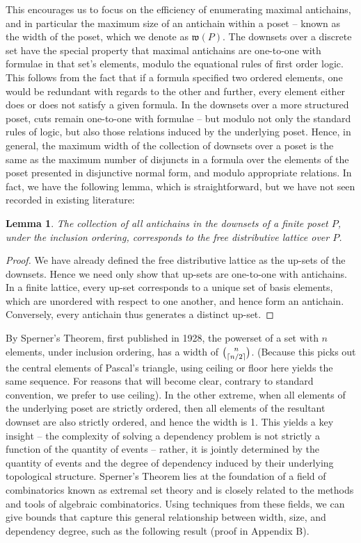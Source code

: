 \documentclass[hoptionsi,review,format=acmsmall]{acmart}
\newtheorem{lemma}[theorem]{Lemma}
\theoremstyle{definition}
\newcommand{\Wf}{\mathfrak{w}}
\DeclarePairedDelimiter\ceil{\lceil}{\rceil}
\begin{document}
This encourages us to focus on the efficiency of enumerating maximal antichains, and in particular the maximum size of an antichain within a poset -- known as the width of the poset, which we denote as \(\Wf(P)\). The downsets over a discrete set have the special property that maximal antichains are one-to-one with formulae in that set's elements, modulo the equational rules of first order logic. This follows from the fact that if a formula specified two ordered elements, one would be redundant with regards to the other and further, every element either does or does not satisfy a given formula. In the downsets over a more structured poset, cuts remain one-to-one with formulae -- but modulo not only the standard rules of logic, but also those relations induced by the underlying poset. Hence, in general, the maximum width of the collection of downsets over a poset is the same as the maximum number of disjuncts in a formula over the elements of the poset presented in disjunctive normal form, and modulo appropriate relations. In fact, we have the following lemma, which is straightforward, but we have not seen recorded in existing literature:

\begin{lemma}
The collection of all antichains in the downsets of a finite poset \(P\), under the inclusion ordering, corresponds to the free distributive lattice over \(P\).
\end{lemma}
\begin{proof}
We have already defined the free distributive lattice as the up-sets of the downsets. Hence we need only show that up-sets are one-to-one with antichains. In a finite lattice, every up-set corresponds to a unique set of basis elements, which are unordered with respect to one another, and hence form an antichain. Conversely, every antichain thus generates a distinct up-set.
\end{proof}

By Sperner's Theorem, first published in 1928, the powerset of a set with \(n\) elements, under inclusion ordering, has a width of \(\binom{n}{\ceil{n/2}}\). (Because this picks out the central elements of Pascal's triangle, using ceiling or floor here yields the same sequence. For reasons that will become clear, contrary to standard convention, we prefer to use ceiling). In the other extreme, when all elements of the underlying poset are strictly ordered, then all elements of the resultant downset are also strictly ordered, and hence the width is 1. This yields a key insight -- the complexity of solving a dependency problem is not strictly a function of the quantity of events -- rather, it is jointly determined by the quantity of events and the degree of dependency induced by their underlying topological structure. Sperner's Theorem lies at the foundation of a field of combinatorics known as extremal set theory and is closely related to the methods and tools of algebraic combinatorics. Using techniques from these fields, we can give bounds that capture this general relationship between width, size, and dependency degree, such as the following result (proof in Appendix B).
\end{document}
